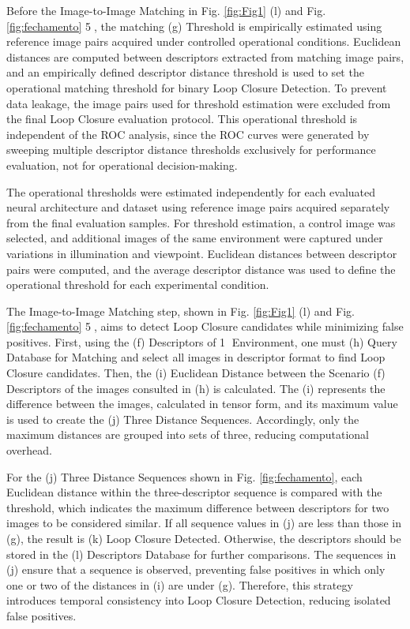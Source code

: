 \documentclass{ieeeaccess}
\newcommand{\circled}[1]{\textcircled{\scriptsize #1}}
\begin{document}
Before the Image-to-Image Matching in Fig. \ref{fig:Fig1} (l) and Fig. \ref{fig:fechamento} \circled{5}, the matching (g) Threshold is empirically estimated using reference image pairs acquired under controlled operational conditions. Euclidean distances are computed between descriptors extracted from matching image pairs, and an empirically defined descriptor distance threshold is used to set the operational matching threshold for binary Loop Closure Detection. To prevent data leakage, the image pairs used for threshold estimation were excluded from the final Loop Closure evaluation protocol. This operational threshold is independent of the ROC analysis, since the ROC curves were generated by sweeping multiple descriptor distance thresholds exclusively for performance evaluation, not for operational decision-making.

The operational thresholds were estimated independently for each evaluated neural architecture and dataset using reference image pairs acquired separately from the final evaluation samples. For threshold estimation, a control image was selected, and additional images of the same environment were captured under variations in illumination and viewpoint. Euclidean distances between descriptor pairs were computed, and the average descriptor distance was used to define the operational threshold for each experimental condition.

The Image-to-Image Matching step, shown in Fig. \ref{fig:Fig1} (l) and Fig. \ref{fig:fechamento} \circled{5}, aims to detect Loop Closure candidates while minimizing false positives. First, using the (f) Descriptors of \circled{1} Environment, one must (h) Query Database for Matching and select all images in descriptor format to find Loop Closure candidates. Then, the (i) Euclidean Distance between the Scenario (f) Descriptors of the images consulted in (h) is calculated. The (i) represents the difference between the images, calculated in tensor form, and its maximum value is used to create the (j) Three Distance Sequences. Accordingly, only the maximum distances are grouped into sets of three, reducing computational overhead. 

For the (j) Three Distance Sequences shown in Fig. \ref{fig:fechamento}, each Euclidean distance within the three-descriptor sequence is compared with the threshold, which indicates the maximum difference between descriptors for two images to be considered similar. If all sequence values in (j) are less than those in (g), the result is (k) Loop Closure Detected. Otherwise, the descriptors should be stored in the (l) Descriptors Database for further comparisons. The sequences in (j) ensure that a sequence is observed, preventing false positives in which only one or two of the distances in (i) are under (g). Therefore, this strategy introduces temporal consistency into Loop Closure Detection, reducing isolated false positives.
\end{document}
